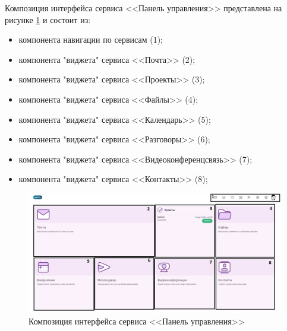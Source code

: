 Композиция интерфейса сервиса <<Панель управления>> представлена на рисунке \ref{templ:image4} и состоит из:
\begin{itemize}
  \item компонента навигации по сервисам (1);
  \item компонента "виджета" сервиса <<Почта>> (2);
  \item компонента "виджета" сервиса <<Проекты>> (3);
  \item компонента "виджета" сервиса <<Файлы>> (4);
  \item компонента "виджета" сервиса <<Календарь>> (5);
  \item компонента "виджета" сервиса <<Разговоры>> (6);
  \item компонента "виджета" сервиса <<Видеоконференцсвязь>> (7);
  \item компонента "виджета" сервиса <<Контакты>> (8);
\end{itemize}
\begin{figure}[H]
	\centering
	\includegraphics[width=1\linewidth]{images/дашборд}
	\caption{Композиция интерфейса сервиса <<Панель управления>>}
	\label{templ:image4}
\end{figure}


